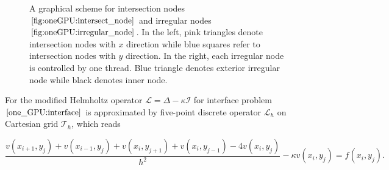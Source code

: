 \begin{figure}[htpt!]
    \centering
    \caption{A graphical scheme for intersection nodes $\ref{fig:oneGPU:intersect_node}$ and irregular nodes $\ref{fig:oneGPU:irregular_node}$. In the left, pink triangles denote intersection nodes with $x$ direction while blue squares refer to intersection nodes with $y$ direction. In the right, each irregular node is controlled by one thread. Blue triangle denotes exterior irregular node while black denotes inner node.}
    \label{fig:One_GPU:irregular_node}
\end{figure}

\iffalse
For the modified Helmholtz operator $\mathcal{L} = \Delta - \kappa \mathcal{I}$ for interface problem $\eqref{one_GPU:interface}$ is approximated by five-point discrete operator $\mathcal{L}_{h}$ on Cartesian grid $\mathcal{T}_{h}$, which reads

\begin{equation}
\frac{ v(x_{i+1},y_j)+ v(x_{i-1},y_j)+ v(x_i,y_{j+1})+ v(x_i,y_{j-1})-4  v(x_i,y_j)}{h^{2}}-\kappa v(x_i,y_j)=f(x_i,y_j).
\label{five-point}
\end{equation}

